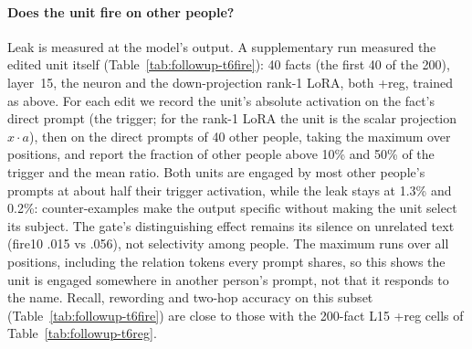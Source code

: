 \documentclass[11pt]{article}
\begin{document}
\paragraph{Does the unit fire on other people?} Leak is measured at
the model's output. A supplementary run measured the edited unit
itself (Table~\ref{tab:followup-t6fire}): 40 facts (the first 40 of
the 200), layer~15, the neuron and the down-projection rank-1 LoRA,
both +reg, trained as above. For each edit we record the unit's
absolute activation on the fact's direct prompt (the trigger; for the
rank-1 LoRA the unit is the scalar projection $x\cdot a$), then on the
direct prompts of 40 other people, taking the maximum over positions,
and report the fraction of other people above 10\% and 50\% of the
trigger and the mean ratio. Both units are engaged by most other
people's prompts at about half their trigger activation, while the
leak stays at 1.3\% and 0.2\%: counter-examples make the output
specific without making the unit select its subject. The gate's
distinguishing effect remains its silence on unrelated text (fire10
.015 vs .056), not selectivity among people. The maximum runs over
all positions, including the relation tokens every prompt shares, so
this shows the unit is engaged somewhere in another person's prompt,
not that it responds to the name. Recall, rewording and two-hop
accuracy on this subset (Table~\ref{tab:followup-t6fire}) are close to those
with the 200-fact L15 +reg cells of Table~\ref{tab:followup-t6reg}.

\begin{table}[t]
\centering
\caption{Does the edited unit fire on other people? Layer~15, +reg, 40
facts per row, mean with 95\% bootstrap CI over facts. ``$>$10\%'' and
``$>$50\%'': fraction of 40 other people whose prompt drives the unit
(max over positions) above that fraction of its activation on the
fact's own prompt. Direct recall is 1.00 in both rows.}
\label{tab:followup-t6fire}
\small
\setlength{\tabcolsep}{3pt}
\end{table}
\end{document}
